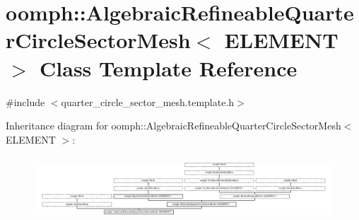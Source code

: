 \hypertarget{classoomph_1_1AlgebraicRefineableQuarterCircleSectorMesh}{}\section{oomph\+:\+:Algebraic\+Refineable\+Quarter\+Circle\+Sector\+Mesh$<$ E\+L\+E\+M\+E\+NT $>$ Class Template Reference}
\label{classoomph_1_1AlgebraicRefineableQuarterCircleSectorMesh}


{\ttfamily \#include $<$quarter\+\_\+circle\+\_\+sector\+\_\+mesh.\+template.\+h$>$}

Inheritance diagram for oomph\+:\+:Algebraic\+Refineable\+Quarter\+Circle\+Sector\+Mesh$<$ E\+L\+E\+M\+E\+NT $>$\+:\begin{figure}[H]
\begin{center}
\leavevmode
\includegraphics[height=2.413793cm]{classoomph_1_1AlgebraicRefineableQuarterCircleSectorMesh}
\end{center}
\end{figure}
